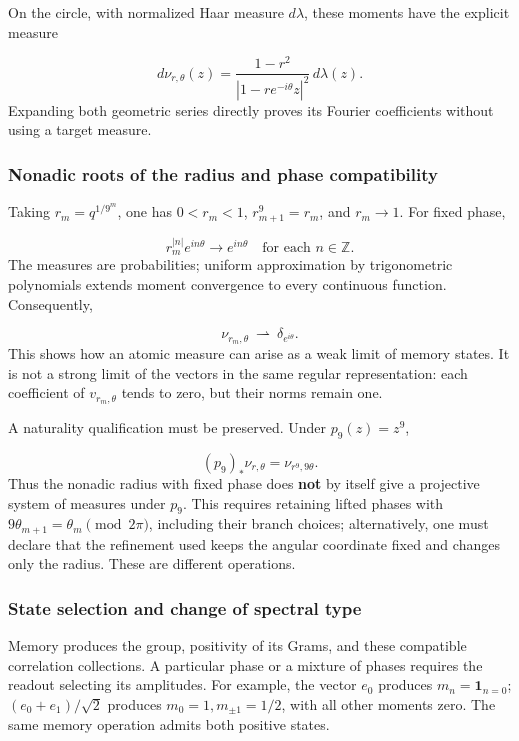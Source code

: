 On the circle, with normalized Haar measure \(d\lambda\), these moments have the explicit measure

\[
d\nu_{r,\theta}(z)
=\frac{1-r^2}{|1-r e^{-i\theta}z|^2}\,d\lambda(z).
\]
Expanding both geometric series directly proves its Fourier coefficients without using a target measure.


\subsubsection{Nonadic roots of the radius and phase compatibility}
\label{tm-add-m3-1}
Taking \(r_m=q^{1/9^m}\), one has \(0<r_m<1\), \(r_{m+1}^{9}=r_m\), and \(r_m\to1\). For fixed phase,

\[
r_m^{|n|}e^{in\theta}\longrightarrow e^{in\theta}
\quad\text{for each }n\in\mathbb Z.
\]
The measures are probabilities; uniform approximation by trigonometric polynomials extends moment convergence to every continuous function. Consequently,

\[
\nu_{r_m,\theta}\ \rightharpoonup\ \delta_{e^{i\theta}}.
\]
This shows how an atomic measure can arise as a weak limit of memory states. It is not a strong limit of the vectors in the same regular representation: each coefficient of \(v_{r_m,\theta}\) tends to zero, but their norms remain one.

A naturality qualification must be preserved. Under \(p_9(z)=z^9\),

\[
(p_9)_*\nu_{r,\theta}=\nu_{r^9,9\theta}.
\]
Thus the nonadic radius with fixed phase does \textbf{not} by itself give a projective system of measures under \(p_9\). This requires retaining lifted phases with \(9\theta_{m+1}=\theta_m\pmod{2\pi}\), including their branch choices; alternatively, one must declare that the refinement used keeps the angular coordinate fixed and changes only the radius. These are different operations.


\subsubsection{State selection and change of spectral type}
\label{tm-add-m3-2}
Memory produces the group, positivity of its Grams, and these compatible correlation collections. A particular phase or a mixture of phases requires the readout selecting its amplitudes. For example, the vector \(e_0\) produces \(m_n=\mathbf1_{n=0}\); \((e_0+e_1)/\sqrt2\) produces \(m_0=1,m_{\pm1}=1/2\), with all other moments zero. The same memory operation admits both positive states.

